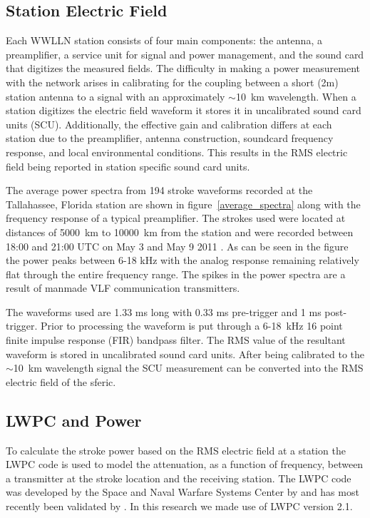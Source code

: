 \documentclass[12pt]{article}
\begin{document}
\subsection{Station Electric Field}

Each WWLLN station consists of four main components: the antenna, a preamplifier, a service unit for signal and power management, and the sound card that digitizes the measured fields. The difficulty in making a power measurement with the network arises in calibrating for the coupling between a short (2m) station antenna to a signal with an approximately $\sim$10~km wavelength. When a station digitizes the electric field waveform it stores it in uncalibrated sound card units (SCU). Additionally, the effective gain and calibration differs at each station due to the preamplifier, antenna construction, soundcard frequency response, and local environmental conditions. This results in the RMS electric field being reported in station specific sound card units.

The average power spectra from 194 stroke waveforms recorded at the Tallahassee, Florida station are shown in figure~\ref{average_spectra} along with the frequency response of a typical preamplifier. The strokes used were located at distances of 5000~km to 10000~km from the station and were recorded between 18:00 and 21:00 UTC on May 3 and May 9 2011 . As can be seen in the figure the power peaks between 6-18 kHz with the analog response remaining relatively flat through the entire frequency range. The spikes in the power spectra are a result of manmade VLF communication transmitters.


The waveforms used are 1.33 ms long with 0.33 ms pre-trigger and 1 ms post-trigger. Prior to processing the waveform is put through a 6-18~kHz 16 point finite impulse response (FIR) bandpass filter. The RMS value of the resultant waveform is stored in uncalibrated sound card units. After being calibrated to the $\sim$10~km wavelength signal the SCU measurement can be converted into the RMS electric field of the sferic. 

\subsection{LWPC and Power}

To calculate the stroke power based on the RMS electric field at a station the LWPC code is used to model the attenuation, as a function of frequency, between a transmitter at the stroke location and the receiving station. The LWPC code was developed by the Space and Naval Warfare Systems Center by \citet{Ferguson1998} and has most recently been validated by \citet{Thomson2011}. In this research we made use of LWPC version 2.1.
\end{document}
